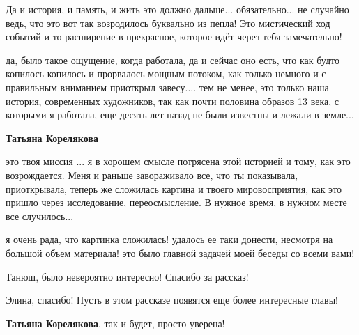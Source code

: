 \begin{itemize}
\begin{itemize}

Да и история, и память, и жить это должно дальше... обязательно... не случайно
ведь, что это вот так возродилось буквально из пепла! Это мистический ход
событий и то расширение в прекрасное, которое идёт через тебя замечательно!


да, было такое ощущение, когда работала, да и сейчас оно есть, что как будто
копилось-копилось и прорвалось мощным потоком, как только немного и с
правильным вниманием приоткрыл завесу.... тем не менее, это только наша история,
современных художников, так как почти половина образов 13 века, с которыми я
работала, еще десять лет назад не были известны и лежали в земле...

\textbf{Татьяна Корелякова} 

это твоя миссия ... я в хорошем смысле потрясена этой историей и тому, как это
возрождается. Меня и раньше завораживало все, что ты показывала,
приоткрывала, теперь же сложилась картина и твоего мировосприятия, как это
пришло через исследование, переосмысление. В нужное время, в нужном месте все
случилось...


я очень рада, что картинка сложилась! удалось ее таки донести, несмотря на
большой объем материала! это было главной задачей моей беседы со всеми вами!

\end{itemize} %

Танюш, было невероятно интересно! Спасибо за рассказ!

Элина, спасибо! Пусть в этом рассказе появятся еще более интересные главы!

\textbf{Татьяна Корелякова}, так и будет, просто уверена!

\end{itemize} %
